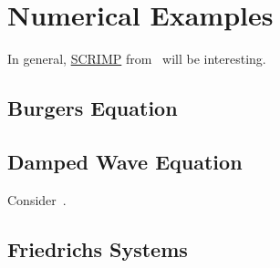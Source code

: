 \section{Numerical Examples}

In general, \href{https://g-haine.github.io/scrimp/index.html#}{SCRIMP} from~\cite{Brugnoli2021} will be interesting.

\subsection{Burgers Equation}


\subsection{Damped Wave Equation}

Consider~\cite{Serhani2019}.


\subsection{Friedrichs Systems}

